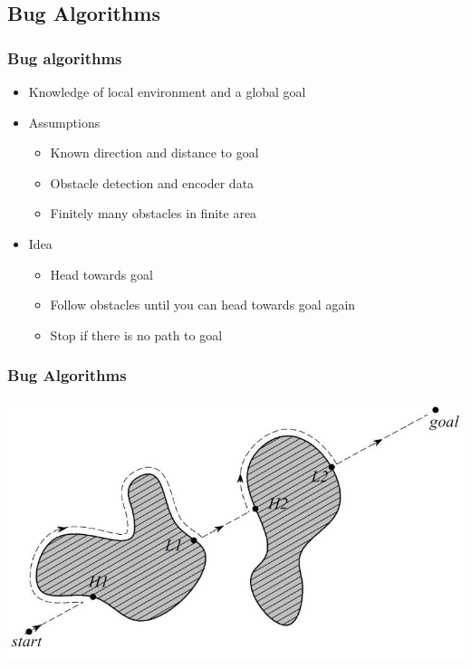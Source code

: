 \documentclass{beamer}
\begin{document}
\subsection{Bug Algorithms}
\begin{frame}
\frametitle{Bug algorithms}
\begin{itemize}
\item Knowledge of local environment and a global goal
\item Assumptions
\begin{itemize}
\item Known direction and distance to goal
\item Obstacle detection and encoder data
\item Finitely many obstacles in finite area
\end{itemize}
\item Idea
\begin{itemize}
\item Head towards goal
\item Follow obstacles until you can head towards goal again
\item Stop if there is no path to goal
\end{itemize}
\end{itemize}
\end{frame}

\begin{frame}
\frametitle{Bug Algorithms}
\includegraphics[scale=1]{assets/images/BugAlgorithms.jpg}
\end{frame}
\end{document}
